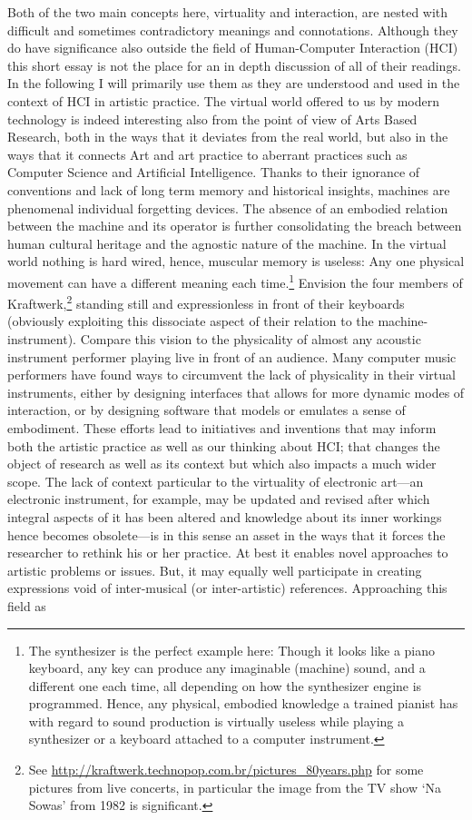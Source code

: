 Both of the two main concepts here, virtuality and interaction, are nested with difficult and sometimes contradictory meanings and connotations. Although they do have significance also outside the field of Human-Computer Interaction (HCI) this short essay is not the place for an in depth discussion of all of their readings. In the following I will primarily use them as they are understood and used in the context of HCI in artistic practice. The virtual world offered to us by modern technology is indeed interesting also from the point of view of Arts Based Research, both in the ways that it deviates from the real world, but also in the ways that it connects Art and art practice to aberrant practices such as Computer Science and Artificial Intelligence. Thanks to their ignorance of conventions and lack of long term memory and historical insights, machines are phenomenal individual forgetting devices. \parencite{miller04} The absence of an embodied relation between the machine and its operator is further consolidating the breach between human cultural heritage and the agnostic nature of the machine. In the virtual world nothing is hard wired, hence, muscular memory is useless: Any one physical movement can have a different meaning each time.\footnote{The synthesizer is the perfect example here: Though it looks like a piano keyboard, any key can produce any imaginable (machine) sound, and a different one each time, all depending on how the synthesizer engine is programmed. Hence, any physical, embodied knowledge a trained pianist has with regard to sound production is virtually useless while playing a synthesizer or a keyboard attached to a computer instrument.} Envision the four members of Kraftwerk,\footnote{See \url{http://kraftwerk.technopop.com.br/pictures\_80years.php} for some pictures from live concerts, in particular the image from the TV show `Na Sowas' from 1982 is significant.} standing still and expressionless in front of their keyboards (obviously exploiting this dissociate aspect of their relation to the machine-instrument). Compare this vision to the physicality of almost any acoustic instrument performer playing live in front of an audience. Many computer music performers have found ways to circumvent the lack of physicality in their virtual instruments, either by designing interfaces that allows for more dynamic modes of interaction, or by designing software that models or emulates a sense of embodiment. These efforts lead to initiatives and inventions that may inform both the artistic practice as well as our thinking about HCI; that changes the object of research as well as its context but which also impacts a much wider scope. The lack of context particular to the virtuality of electronic art---an electronic instrument, for example, may be updated and revised after which integral aspects of it has been altered and knowledge about its inner workings hence becomes obsolete---is in this sense an asset in the ways that it forces the researcher to rethink his or her practice. \parencite[This may equally well be a frustration as is described in][]{ostertag02} At best it enables novel approaches to artistic problems or issues. But, it may equally well participate in creating expressions void of inter-musical (or inter-artistic) references. Approaching this field as 